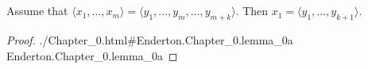 \documentclass{article}
\newcommand{\lean}[1]{\leanref
  {./Chapter\_0.html\#Enderton.Chapter\_0.#1}
  {Enderton.Chapter\_0.#1}}
\begin{document}

\section*{}%
%

Assume that $\langle x_1, \ldots, x_m \rangle =
  \langle y_1, \ldots, y_m, \ldots, y_{m+k} \rangle$.
Then $x_1 = \langle y_1, \ldots, y_{k+1} \rangle$.

\begin{proof}

  \lean{lemma\_0a}

\end{proof}
\end{document}
